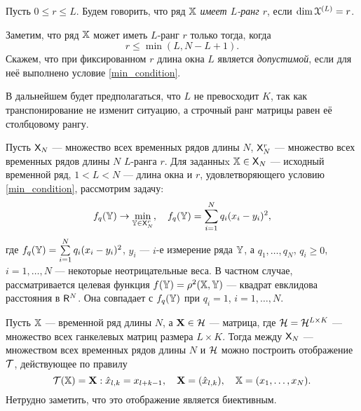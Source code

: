\documentclass[12pt,a4paper,fleqn,leqno]{article}
\begin{document}
\begin{definition}
Пусть $0 \le r \le L$. Будем говорить, что ряд $\mathbb{X}$ \emph{имеет $L$-ранг $r$}, если $\dim \EuScript{X}^{(L)} = r$.
\end{definition}

Заметим, что ряд $\mathbb{X}$ может иметь $L$-ранг $r$ только тогда, когда
\begin{equation}
r \le \min(L, N-L+1). \label{min_condition}
\end{equation}
Скажем, что при фиксированном $r$ длина окна $L$ является \emph{допустимой}, если для неё выполнено условие \eqref{min_condition}.

В дальнейшем будет предполагаться, что $L$ не превосходит $K$, так как транспонирование не изменит ситуацию, а строчный ранг матрицы равен её столбцовому рангу.

Пусть $\mathsf{X}_N$ --- множество всех временных рядов длины $N$, $\mathsf{X}_N^r$ --- множество всех временных рядов длины $N$ $L$-ранга $r$. Для заданныx $\mathbb{X} \in \mathsf{X}_N$ --- исходный временной ряд, $1 < L < N$ --- длина окна и $r$, удовлетворяющего условию \eqref{min_condition}, рассмотрим задачу:
\begin{equation} \label{L-rank_task}
f_q(\mathbb{Y}) \to \min_{\mathbb{Y} \in \mathsf{X}_N^r}, \quad f_q(\mathbb{Y}) = \sum \limits_{i=1}^N q_i(x_i - y_i)^2,
\end{equation}
где $f_q(\mathbb{Y}) = \sum \limits_{i=1}^N q_i(x_i - y_i)^2$, $y_i$ --- $i$-е измерение ряда $\mathbb{Y}$, а $q_1, \ldots, q_N$, $q_i \ge 0$, $i = 1, \ldots, N$ --- некоторые неотрицательные веса. В частном случае, рассматривается целевая функция $f(\mathbb{Y}) = \rho^2(\mathbb{X}, \mathbb{Y})$ --- квадрат евклидова расстояния в $\mathsf{R}^N$. Она совпадает с $f_q(\mathbb{Y})$ при $q_i = 1$, $i = 1, \ldots, N$.

Пусть $\mathbb{X}$ --- временной ряд длины $N$, а $\mathbf{X} \in \mathcal{H}$ --- матрица, где $\mathcal{H} = \mathcal{H}^{L \times K}$ --- множество всех ганкелевых матриц размера $L \times K$. Тогда между $\mathsf{X}_N$ --- множеством всех временных рядов длины $N$ и $\mathcal{H}$ можно построить отображение $\mathcal{T}$, действующее по правилу
\begin{equation*}
\mathcal{T}(\mathbb{X}) = \mathbf{X}: \hat x_{l, k} = x_{l + k - 1}, \quad \mathbf{X} = (\hat x_{l,k}), \quad \mathbb{X} = (x_1, \ldots, x_N).
\end{equation*}
Нетрудно заметить, что это отображение является биективным.
\end{document}
